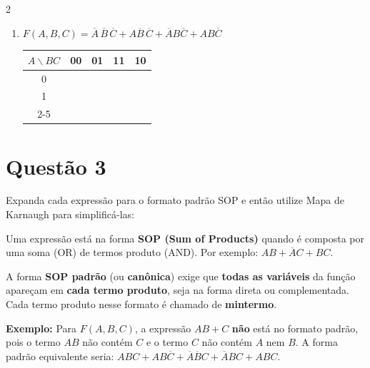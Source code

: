 \documentclass[12pt,a4paper]{article}
\begin{document}
\begin{multicols}{2}
\begin{enumerate}[label=\alph*)]
  \item \begin{minipage}[t]{\linewidth}
    {\small $F(A,B,C) = \overline{A}\,\overline{B}\,\overline{C} + A\overline{B}\,\overline{C} + \overline{A}B\overline{C} + AB\overline{C}$}

    \begin{center}
      \begin{tabular}{c|c|c|c|c|}
        $A \backslash BC$ & 00 & 01 & 11 & \multicolumn{1}{c}{10} \\
        \hline
        0 & \phantom{0} & \phantom{0} & \phantom{0} & \phantom{0} \\
        \hline
        1 & \phantom{0} & \phantom{0} & \phantom{0} & \phantom{0} \\
        \cline{2-5}
      \end{tabular}
    \end{center}
  \end{minipage}

\end{enumerate}
\end{multicols}

\vfill

\newpage

\section{Questão 3}

Expanda cada expressão para o formato padrão SOP e então utilize Mapa de Karnaugh para simplificá-las:

\begin{tcolorbox}[colback=gray!10, colframe=gray!50, title=\textbf{Lembrete: Soma de Produtos (SOP)}, fonttitle=\small]
\small
Uma expressão está na forma \textbf{SOP (Sum of Products)} quando é composta por uma soma (OR) de termos produto (AND). Por exemplo: $AB + \overline{A}C + BC$.

A forma \textbf{SOP padrão} (ou \textbf{canônica}) exige que \textbf{todas as variáveis} da função apareçam em \textbf{cada termo produto}, seja na forma direta ou complementada. Cada termo produto nesse formato é chamado de \textbf{mintermo}.

\textbf{Exemplo:} Para $F(A,B,C)$, a expressão $AB + C$ \textbf{não} está no formato padrão, pois o termo $AB$ não contém $C$ e o termo $C$ não contém $A$ nem $B$. A forma padrão equivalente seria: $ABC + AB\overline{C} + \overline{A}\overline{B}C + \overline{A}BC + ABC$.
\end{tcolorbox}
\end{document}
